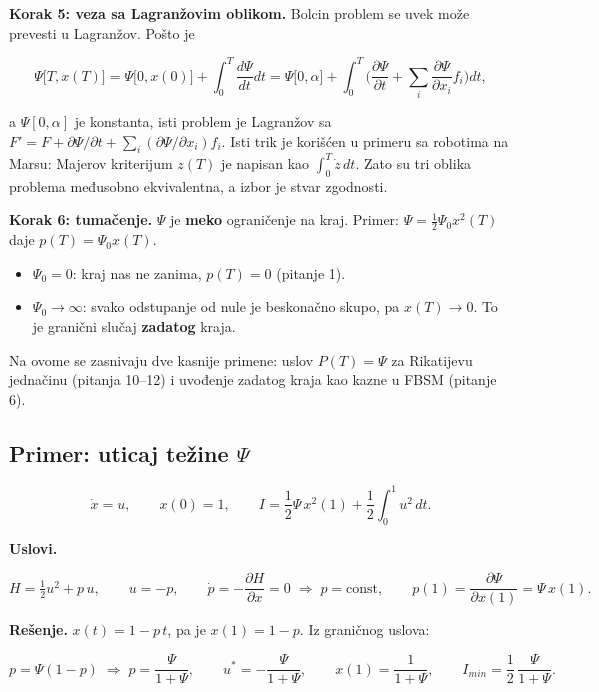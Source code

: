 \documentclass[11pt,a4paper,parskip=half,headsepline,numbers=noenddot]{scrartcl}
\begin{document}
\textbf{Korak 5: veza sa Lagranžovim oblikom.} Bolcin problem se uvek može prevesti u Lagranžov. Pošto je

\[\Psi\big[T, x(T)\big] = \Psi\big[0, x(0)\big] + \int_0^T\frac{d\Psi}{dt}dt = \Psi\big[0, \alpha\big] + \int_0^T\Big(\frac{\partial\Psi}{\partial t} + \sum_i\frac{\partial\Psi}{\partial x_i}f_i\Big)dt,\]

a \(\Psi[0, \alpha]\) je konstanta, isti problem je Lagranžov sa \(F' = F + \partial\Psi/\partial t + \sum_i(\partial\Psi/\partial x_i)f_i\). Isti trik je korišćen u primeru sa robotima na Marsu: Majerov kriterijum \(z(T)\) je napisan kao \(\int_0^T\dot z\,dt\). Zato su tri oblika problema međusobno ekvivalentna, a izbor je stvar zgodnosti.

\textbf{Korak 6: tumačenje.} \(\Psi\) je \textbf{meko} ograničenje na kraj. Primer: \(\Psi = \frac12\Psi_0 x^2(T)\) daje \(p(T) = \Psi_0 x(T)\).

\begin{itemize}
\item \(\Psi_0 = 0\): kraj nas ne zanima, \(p(T) = 0\) (pitanje 1).
\item \(\Psi_0 \to \infty\): svako odstupanje od nule je beskonačno skupo, pa \(x(T) \to 0\). To je granični slučaj \textbf{zadatog} kraja.
\end{itemize}

Na ovome se zasnivaju dve kasnije primene: uslov \(P(T) = \Psi\) za Rikatijevu jednačinu (pitanja 10--12) i uvođenje zadatog kraja kao kazne u FBSM (pitanje 6).

\subsection{\texorpdfstring{Primer: uticaj težine \(\Psi\)}{Primer: uticaj težine \textbackslash Psi}}

\[\dot x = u, \qquad x(0) = 1, \qquad I = \frac12\Psi\,x^2(1) + \frac12\int_0^1 u^2\,dt .\]

\textbf{Uslovi.}

\[H = \tfrac12u^2 + p\,u, \qquad u = -p, \qquad \dot p = -\frac{\partial H}{\partial x} = 0 \;\Rightarrow\; p = \text{const}, \qquad p(1) = \frac{\partial\Psi}{\partial x(1)} = \Psi\,x(1) .\]

\textbf{Rešenje.} \(x(t) = 1 - p\,t\), pa je \(x(1) = 1 - p\). Iz graničnog uslova:

\[p = \Psi(1 - p) \;\Rightarrow\; p = \frac{\Psi}{1 + \Psi}, \qquad u^* = -\frac{\Psi}{1 + \Psi}, \qquad x(1) = \frac{1}{1 + \Psi}, \qquad I_{min} = \frac12\,\frac{\Psi}{1 + \Psi} .\]
\end{document}
